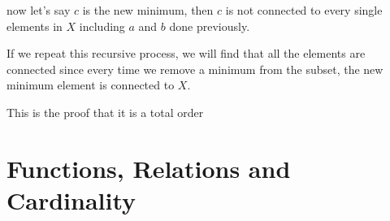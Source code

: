 \documentclass[12pts,A4]{article}
\begin{document}
\begin{flushleft}
    \bigskip

    now let's say $c$ is the new minimum, then $c$ is not connected to every single elements in $X$ including $a$ and $b$ done previously.

    If we repeat this recursive process, we will find that all the elements are connected since every time we remove a minimum from the subset, the new minimum element is connected to $X$.
    
    \bigskip

    This is the proof that it is a total order 
     


    \end{flushleft} 

\section{Functions, Relations and Cardinality}
\end{document}
